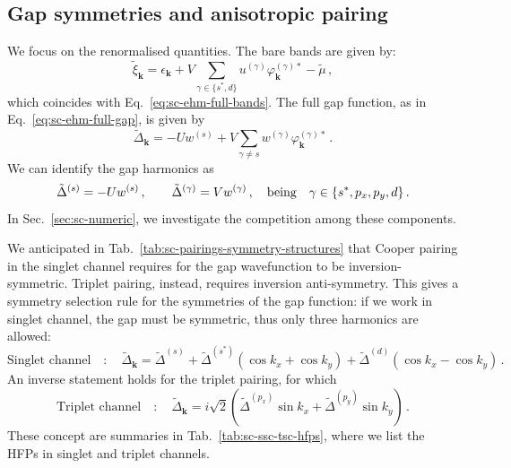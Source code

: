 \subsection{Gap symmetries and anisotropic pairing}\label{sec:sc-gap-syms}

We focus on the renormalised quantities. The bare bands are given by:
\begin{equation}\label{appeq:sc-ehm-full-bands}
	\tilde{\xi}_\mathbf{k} = \epsilon_\mathbf{k} + V \sum_{\gamma\in\lbrace s^*,d \rbrace} u^{(\gamma)} \varphi_{\mathbf{k}}^{(\gamma)*} - \tilde{\mu} \, ,
\end{equation}
which coincides with Eq.~\eqref{eq:sc-ehm-full-bands}. The full gap function, as in Eq.~\eqref{eq:sc-ehm-full-gap}, is given by
\begin{equation}\label{appeq:sc-ehm-full-gap}
	\tilde{\Delta}_\mathbf{k} = -Uw^{(s)} + V \sum_{\gamma \neq s} w^{(\gamma)} \varphi_\mathbf{k}^{(\gamma)*} \, .
\end{equation}
We can identify the gap harmonics as
\[
\tilde{\Delta}^{(s)} = -U w^{(s)} \, ,
\qquad
\tilde{\Delta}^{(\gamma)} = V w^{(\gamma)} \, ,
\qq{being}
\gamma\in\lbrace s^*, p_x, p_y, d \rbrace \, .
\]
In Sec.~\ref{sec:sc-numeric}, we investigate the competition among these components.

We anticipated in Tab.~\ref{tab:sc-pairings-symmetry-structures} that Cooper pairing in the singlet channel requires for the gap wavefunction to be inversion-symmetric. Triplet pairing, instead, requires inversion anti-symmetry.
This gives a symmetry selection rule for the symmetries of the gap function: if we work in singlet channel, the gap must be symmetric, thus only three harmonics are allowed:
\[
	\text{Singlet channel}
	\quad\colon\quad
	\tilde{\Delta}_\mathbf{k} = \tilde{\Delta}^{(s)} + \tilde{\Delta}^{(s^*)} (\cos k_x + \cos k_y) + \tilde{\Delta}^{(d)} (\cos k_x - \cos k_y) \, .
\]
An inverse statement holds for the triplet pairing, for which
\[
	\text{Triplet channel}
	\quad\colon\quad
	\tilde{\Delta}_\mathbf{k} = i\sqrt{2} \left(
	\tilde{\Delta}^{(p_x)} \sin k_x +  \tilde{\Delta}^{(p_y)} \sin k_y
	\right) \, .
\]
These concept are summaries in Tab.~\ref{tab:sc-ssc-tsc-hfps}, where we list the HFPs in singlet and triplet channels.


